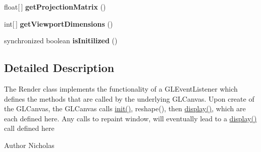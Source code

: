 \begin{DoxyCompactItemize}
\item 
\hypertarget{classview_1_1_renderer_ac7725d68a5f929a47cb6b70a747a42ed}{float\mbox{[}$\,$\mbox{]} {\bfseries get\-Projection\-Matrix} ()}\label{classview_1_1_renderer_ac7725d68a5f929a47cb6b70a747a42ed}

\item 
\hypertarget{classview_1_1_renderer_a5f18309c0140551d21ac5477c68a8db0}{int\mbox{[}$\,$\mbox{]} {\bfseries get\-Viewport\-Dimensions} ()}\label{classview_1_1_renderer_a5f18309c0140551d21ac5477c68a8db0}

\item 
\hypertarget{classview_1_1_renderer_a5201eddadd61f8f8fd013031fd6c5e75}{synchronized boolean {\bfseries is\-Initilized} ()}\label{classview_1_1_renderer_a5201eddadd61f8f8fd013031fd6c5e75}

\end{DoxyCompactItemize}


\subsection{Detailed Description}
The Render class implements the functionality of a G\-L\-Event\-Listener which defines the methods that are called by the underlying G\-L\-Canvas. Upon create of the G\-L\-Canvas, the G\-L\-Canvas calls \hyperlink{classview_1_1_renderer_a8cc3379eb90aa67965f780ec5d93b95a}{init()}, reshape(), then \hyperlink{classview_1_1_renderer_a735a52a16cb1a2c7b21b0b47e140bccc}{display()}, which are each defined here. Any calls to repaint window, will eventually lead to a \hyperlink{classview_1_1_renderer_a735a52a16cb1a2c7b21b0b47e140bccc}{display()} call defined here

\begin{DoxyAuthor}{Author}
Nicholas 
\end{DoxyAuthor}


